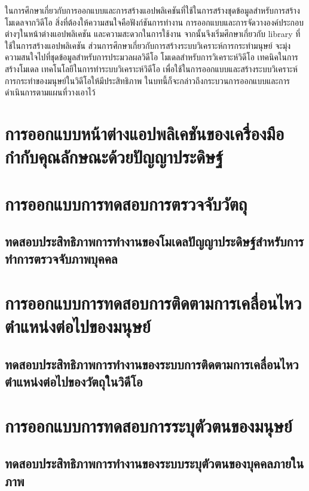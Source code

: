 ในการศึกษาเกี่ยวกับการออกแบบและการสร้างแอปพลิเคชันที่ใช้ในการสร้างชุดข้อมูลสำหรับการสร้างโมเดลจากวิดีโอ 
สิ่งที่ต้องให้ความสนใจคือฟังก์ชันการทำงาน การออกแบบและการจัดวางองค์ประกอบต่างๆในหน้าต่างแอปพลิเคชัน
และความสะดวกในการใช้งาน จากนั้นจึงเริ่มศึกษาเกี่ยวกับ library ที่ใช้ในการสร้างแอปพลิเคชัน
ส่วนการศึกษาเกี่ยวกับการสร้างระบบวิเคราะห์การกระทำมนุษย์ จะมุ่งความสนใจไปที่ชุดข้อมูลสำหรับการประมวลผลวิดีโอ
โมเดลสำหรับการวิเคราะห์วิดีโอ เทคนิคในการสร้างโมเดล เทคโนโลยีในการทำระบบวิเคราะห์วิดีโอ
เพื่อใช้ในการออกแบบและสร้างระบบวิเคราะห์การกระทำของมนุษย์ในวิดีโอให้มีประสิทธิภาพ
ในบทนี้ก็จะกล่าวถึงกระบวนการออกแบบและการดำเนินการตามแผนที่วางเอาไว้
\section{การออกแบบหน้าต่างแอปพลิเคชันของเครื่องมือกำกับคุณลักษณะด้วยปัญญาประดิษฐ์}

\clearpage

\section{การออกแบบการทดสอบการตรวจจับวัตถุ}
\subsection{ทดสอบประสิทธิภาพการทำงานของโมเดลปัญญาประดิษฐ์สำหรับการทำการตรวจจับภาพบุคคล}

\clearpage

\section{การออกแบบการทดสอบการติดตามการเคลื่อนไหวตำแหน่งต่อไปของมนุษย์}
\subsection{ทดสอบประสิทธิภาพการทำงานของระบบการติดตามการเคลื่อนไหวตำแหน่งต่อไปของวัตถุในวิดีโอ}

\clearpage

\section{การออกแบบการทดสอบการระบุตัวตนของมนุษย์}
\subsection{ทดสอบประสิทธิภาพการทำงานของระบบระบุตัวตนของบุคคลภายในภาพ}

\clearpage

